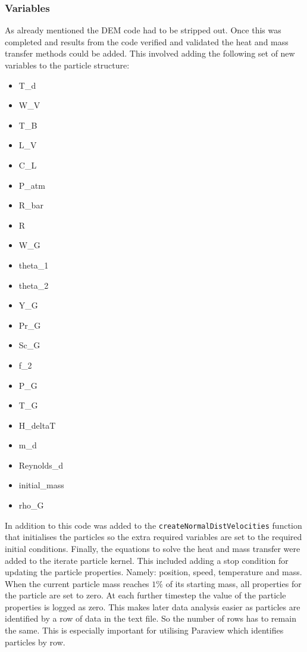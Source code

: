 \documentclass[../Interim_Report_Master]{subfiles}
\begin{document}
\subsubsection{Variables}
As already mentioned the DEM code had to be stripped out. Once this was completed and results from the code verified and validated the heat and mass transfer methods could be added. This involved adding the following set of new variables to the particle structure:
\begin{multicols}{3}
\begin{itemize}
	\item T\_d
	\item W\_V
	\item T\_B
	\item L\_V
	\item C\_L
	\item P\_atm
	\item R\_bar
	\item R
	\item W\_G
	\item theta\_1
	\item theta\_2
	\item Y\_G
	\item Pr\_G
	\item Sc\_G
	\item f\_2
	\item P\_G
	\item T\_G
	\item H\_deltaT
	\item m\_d
	\item Reynolds\_d
	\item initial\_mass
	\item rho\_G
\end{itemize} 
\end{multicols}

In addition to this code was added to the \lstinline[style=cstyleintext]|createNormalDistVelocities| function that initialises the particles so the extra required variables are set to the required initial conditions. Finally, the equations to solve the heat and mass transfer were added to the iterate particle kernel. This included adding a stop condition for updating the particle properties. Namely: position, speed, temperature and mass. When the current particle mass reaches $1\%$ of its starting mass, all properties for the particle are set to zero. At each further timestep the value of the particle properties is logged as zero. This makes later data analysis easier as particles are identified by a row of data in the text file. So the number of rows has to remain the same. This is especially important for utilising Paraview which identifies particles by row.  
\end{document}
